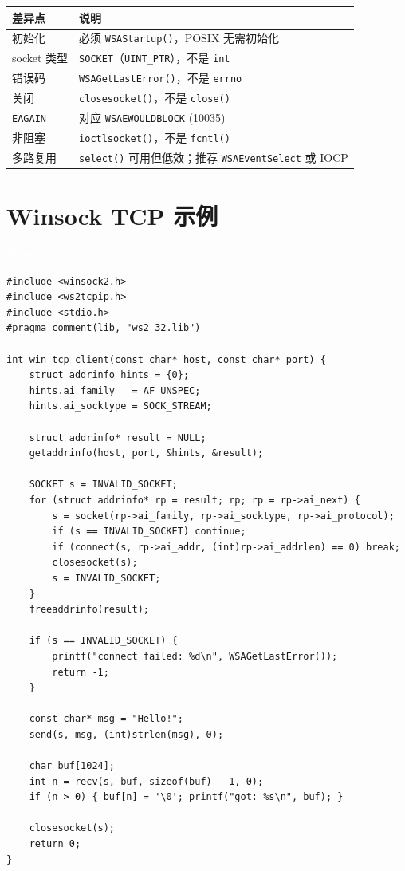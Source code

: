 \documentclass[12pt,a4paper,fontset=fandol]{ctexbook}
\newcommand{\Fn}[1]{\texttt{#1()}}
\newcommand{\Tp}[1]{\texttt{#1}}
\newcommand{\winlabel}{%
  \noindent\begin{tcolorbox}[sharp corners,colback=winheadbg,colframe=winheadbg,
    left=6pt,right=6pt,top=2pt,bottom=2pt,boxrule=0pt]
  \textcolor{white}{\small\bfseries\sffamily Winsock}\end{tcolorbox}%
}
\begin{document}
\begin{warning}[title=Winsock 与 POSIX 的关键差异]
\begin{tabular}{ll}
\toprule
\textbf{差异点} & \textbf{说明} \\
\midrule
初始化 & 必须 \Fn{WSAStartup}，POSIX 无需初始化 \\
socket 类型 & \Tp{SOCKET}（\Tp{UINT\_PTR}），不是 \Tp{int} \\
错误码 & \Tp{WSAGetLastError()}，不是 \Tp{errno} \\
关闭 & \Tp{closesocket()}，不是 \Tp{close()} \\
\Tp{EAGAIN} & 对应 \Tp{WSAEWOULDBLOCK} (10035) \\
非阻塞 & \Tp{ioctlsocket()}，不是 \Fn{fcntl} \\
多路复用 & \Tp{select()} 可用但低效；推荐 \Tp{WSAEventSelect} 或 IOCP \\
\bottomrule
\end{tabular}
\end{warning}

\section{Winsock TCP 示例}

\winlabel
\begin{lstlisting}[style=cstyle]
#include <winsock2.h>
#include <ws2tcpip.h>
#include <stdio.h>
#pragma comment(lib, "ws2_32.lib")

int win_tcp_client(const char* host, const char* port) {
    struct addrinfo hints = {0};
    hints.ai_family   = AF_UNSPEC;
    hints.ai_socktype = SOCK_STREAM;

    struct addrinfo* result = NULL;
    getaddrinfo(host, port, &hints, &result);

    SOCKET s = INVALID_SOCKET;
    for (struct addrinfo* rp = result; rp; rp = rp->ai_next) {
        s = socket(rp->ai_family, rp->ai_socktype, rp->ai_protocol);
        if (s == INVALID_SOCKET) continue;
        if (connect(s, rp->ai_addr, (int)rp->ai_addrlen) == 0) break;
        closesocket(s);
        s = INVALID_SOCKET;
    }
    freeaddrinfo(result);

    if (s == INVALID_SOCKET) {
        printf("connect failed: %d\n", WSAGetLastError());
        return -1;
    }

    const char* msg = "Hello!";
    send(s, msg, (int)strlen(msg), 0);

    char buf[1024];
    int n = recv(s, buf, sizeof(buf) - 1, 0);
    if (n > 0) { buf[n] = '\0'; printf("got: %s\n", buf); }

    closesocket(s);
    return 0;
}
\end{lstlisting}
\end{document}
